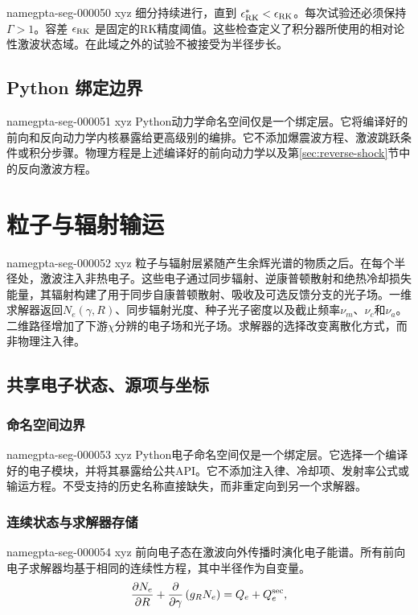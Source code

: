 \documentclass[twocolumn]{aastex702}
\makeatletter
\providecommand{\gptareaderanchor}[1]{\pdfdest name{#1} xyz}%
\providecommand{\gptareaderanchor}[1]{\special{pdf:dest (#1) [ @thispage /XYZ @xpos @ypos null ]}}%
\makeatother
\begin{document}
\gptareaderanchor{gpta-seg-000050}%
细分持续进行，直到 \(\epsilon_{\rm RK}^\ast<\epsilon_{\rm RK}\)。每次试验还必须保持 \(\Gamma>1\)。容差 \(\epsilon_{\rm RK}\) 是固定的RK精度阈值。这些检查定义了积分器所使用的相对论性激波状态域。在此域之外的试验不被接受为半径步长。

\subsection{Python 绑定边界}


\gptareaderanchor{gpta-seg-000051}%
Python动力学命名空间仅是一个绑定层。它将编译好的前向和反向动力学内核暴露给更高级别的编排。它不添加爆震波方程、激波跳跃条件或积分步骤。物理方程是上述编译好的前向动力学以及第\ref{sec:reverse-shock}节中的反向激波方程。

\section{粒子与辐射输运} \label{sec:electron}


\gptareaderanchor{gpta-seg-000052}%
粒子与辐射层紧随产生余辉光谱的物质之后。在每个半径处，激波注入非热电子。这些电子通过同步辐射、逆康普顿散射和绝热冷却损失能量，其辐射构建了用于同步自康普顿散射、吸收及可选反馈分支的光子场。一维求解器返回\(N_e(\gamma,R)\)、同步辐射光度、种子光子密度以及截止频率\(\nu_m\)、\(\nu_c\)和\(\nu_a\)。二维路径增加了下游\(\chi\)分辨的电子场和光子场。求解器的选择改变离散化方式，而非物理注入律\citep{LeVeque2002,JiangShu1996,HesthavenWarburton2008}。

\subsection{共享电子状态、源项与坐标}

\subsubsection{命名空间边界}


\gptareaderanchor{gpta-seg-000053}%
Python电子命名空间仅是一个绑定层。它选择一个编译好的电子模块，并将其暴露给公共API。它不添加注入律、冷却项、发射率公式或输运方程。不受支持的历史名称直接缺失，而非重定向到另一个求解器。

\subsubsection{连续状态与求解器存储}


\gptareaderanchor{gpta-seg-000054}%
前向电子态在激波向外传播时演化电子能谱。所有前向电子求解器均基于相同的连续性方程，其中半径作为自变量。
\begin{equation}
\frac{\partial N_e}{\partial R}
+\frac{\partial}{\partial\gamma}
\left(g_RN_e\right)
=Q_e+Q_e^{\rm sec},
\end{equation}
\end{document}
